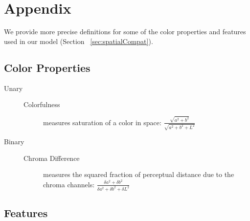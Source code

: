 \section*{Appendix}
\label{sec:appendix}

We provide more precise definitions for some of the color properties and features used in our model (Section ~\ref{sec:spatialCompat}).

\subsection*{Color Properties}

\begin{description}

\item[Unary] \hfill
	\begin{description}
	  \item[Colorfulness] measures saturation of a color in \lab space: $\frac{\sqrt{a^2+b^2}}{\sqrt{a^2+b^2+L^2}}$
	\end{description}
	
\item[Binary] \hfill
	\begin{description}
	  \item[Chroma Difference] measures the squared fraction of perceptual distance due to the chroma channels: $\frac{\delta a^2+\delta b^2}{\delta a^2+\delta b^2+\delta L^2}$
	\end{description}
	
\end{description}

\subsection*{Features}

